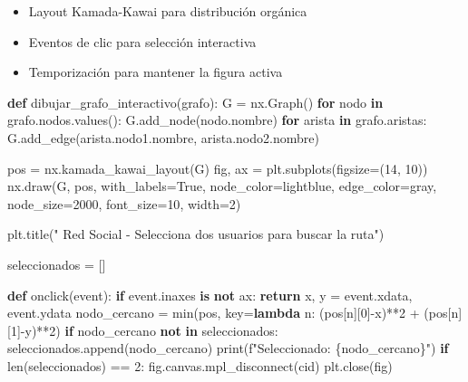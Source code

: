 \documentclass[
  spanish,
  letterpaper,
  DIV=11,
  numbers=noendperiod]{scrartcl}
\newenvironment{Shaded}{\begin{snugshade}}{\end{snugshade}}
\newcommand{\BuiltInTok}[1]{\textcolor[rgb]{0.00,0.23,0.31}{#1}}
\newcommand{\ControlFlowTok}[1]{\textcolor[rgb]{0.00,0.23,0.31}{\textbf{#1}}}
\newcommand{\DecValTok}[1]{\textcolor[rgb]{0.68,0.00,0.00}{#1}}
\newcommand{\KeywordTok}[1]{\textcolor[rgb]{0.00,0.23,0.31}{\textbf{#1}}}
\newcommand{\NormalTok}[1]{\textcolor[rgb]{0.00,0.23,0.31}{#1}}
\newcommand{\OperatorTok}[1]{\textcolor[rgb]{0.37,0.37,0.37}{#1}}
\newcommand{\SpecialCharTok}[1]{\textcolor[rgb]{0.37,0.37,0.37}{#1}}
\newcommand{\SpecialStringTok}[1]{\textcolor[rgb]{0.13,0.47,0.30}{#1}}
\newcommand{\StringTok}[1]{\textcolor[rgb]{0.13,0.47,0.30}{#1}}
\newcommand{\VariableTok}[1]{\textcolor[rgb]{0.07,0.07,0.07}{#1}}
\begin{document}
\begin{itemize}
\item
  Layout Kamada-Kawai para distribución orgánica
\item
  Eventos de clic para selección interactiva
\item
  Temporización para mantener la figura activa
\end{itemize}

\begin{Shaded}
\begin{Highlighting}[]
\KeywordTok{def}\NormalTok{ dibujar\_grafo\_interactivo(grafo):}
\NormalTok{    G }\OperatorTok{=}\NormalTok{ nx.Graph()}
    \ControlFlowTok{for}\NormalTok{ nodo }\KeywordTok{in}\NormalTok{ grafo.nodos.values():}
\NormalTok{        G.add\_node(nodo.nombre)}
    \ControlFlowTok{for}\NormalTok{ arista }\KeywordTok{in}\NormalTok{ grafo.aristas:}
\NormalTok{        G.add\_edge(arista.nodo1.nombre, arista.nodo2.nombre)}

\NormalTok{    pos }\OperatorTok{=}\NormalTok{ nx.kamada\_kawai\_layout(G)}
\NormalTok{    fig, ax }\OperatorTok{=}\NormalTok{ plt.subplots(figsize}\OperatorTok{=}\NormalTok{(}\DecValTok{14}\NormalTok{, }\DecValTok{10}\NormalTok{))}
\NormalTok{    nx.draw(G, pos, with\_labels}\OperatorTok{=}\VariableTok{True}\NormalTok{, node\_color}\OperatorTok{=}\StringTok{\textquotesingle{}lightblue\textquotesingle{}}\NormalTok{, edge\_color}\OperatorTok{=}\StringTok{\textquotesingle{}gray\textquotesingle{}}\NormalTok{,}
\NormalTok{            node\_size}\OperatorTok{=}\DecValTok{2000}\NormalTok{, font\_size}\OperatorTok{=}\DecValTok{10}\NormalTok{, width}\OperatorTok{=}\DecValTok{2}\NormalTok{)}
    
\NormalTok{    plt.title(}\StringTok{" Red Social {-} Selecciona dos usuarios para buscar la ruta"}\NormalTok{)}

\NormalTok{    seleccionados }\OperatorTok{=}\NormalTok{ []}

    \KeywordTok{def}\NormalTok{ onclick(event):}
        \ControlFlowTok{if}\NormalTok{ event.inaxes }\KeywordTok{is} \KeywordTok{not}\NormalTok{ ax:}
            \ControlFlowTok{return}
\NormalTok{        x, y }\OperatorTok{=}\NormalTok{ event.xdata, event.ydata}
\NormalTok{        nodo\_cercano }\OperatorTok{=} \BuiltInTok{min}\NormalTok{(pos, key}\OperatorTok{=}\KeywordTok{lambda}\NormalTok{ n: (pos[n][}\DecValTok{0}\NormalTok{]}\OperatorTok{{-}}\NormalTok{x)}\OperatorTok{**}\DecValTok{2} \OperatorTok{+}\NormalTok{ (pos[n][}\DecValTok{1}\NormalTok{]}\OperatorTok{{-}}\NormalTok{y)}\OperatorTok{**}\DecValTok{2}\NormalTok{)}
        \ControlFlowTok{if}\NormalTok{ nodo\_cercano }\KeywordTok{not} \KeywordTok{in}\NormalTok{ seleccionados:}
\NormalTok{            seleccionados.append(nodo\_cercano)}
            \BuiltInTok{print}\NormalTok{(}\SpecialStringTok{f"Seleccionado: }\SpecialCharTok{\{}\NormalTok{nodo\_cercano}\SpecialCharTok{\}}\SpecialStringTok{"}\NormalTok{)}
        \ControlFlowTok{if} \BuiltInTok{len}\NormalTok{(seleccionados) }\OperatorTok{==} \DecValTok{2}\NormalTok{:}
\NormalTok{            fig.canvas.mpl\_disconnect(cid)}
\NormalTok{            plt.close(fig)}


\end{Highlighting}
\end{Shaded}
\end{document}
